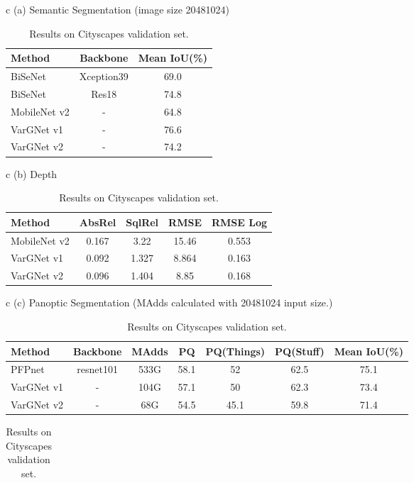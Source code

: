 \documentclass{article}
\begin{document}
\begin{table}
  \centering
  \caption{Results on Cityscapes validation set.}\label{tab:cs_res}
  \begin{tabular}{c}
    (a) Semantic Segmentation (image size 20481024)\\
    \begin{tabular}{lcc}
    \toprule
    Method & Backbone & Mean IoU(\%)  \\ \midrule
    BiSeNet\cite{yu2018bisenet} & Xception39 & 69.0 \\
    BiSeNet\cite{yu2018bisenet} & Res18 & 74.8 \\ \midrule
    MobileNet v2 & - & 64.8 \\ \midrule
    VarGNet v1 & - & 76.6 \\
    VarGNet v2 & - & 74.2 \\
\bottomrule
    \end{tabular} 
  \end{tabular}   
\begin{tabular}{c}
    (b) Depth \\
    \begin{tabular}{lcccc}
      \toprule
      Method & AbsRel & SqlRel & RMSE & RMSE Log \\ \midrule
      MobileNet v2 & 0.167 & 3.22 & 15.46 & 0.553 \\ \midrule
      VarGNet v1 & 0.092 & 1.327 & 8.864 & 0.163 \\
VarGNet v2 & 0.096 & 1.404 & 8.85 & 0.168 \\ 
      \bottomrule
    \end{tabular}   
  \end{tabular}   
  \begin{tabular}{c}
    (c) Panoptic Segmentation (MAdds calculated with 20481024 input size.) \\
    \begin{tabular}{lcccccc}
      \toprule
      Method & Backbone & MAdds & PQ & PQ(Things) & PQ(Stuff) & Mean IoU(\%)  \\ \midrule
      PFPnet\cite{Panoptic} & resnet101 & 533G & 58.1 & 52 & 62.5 & 75.1 \\
      VarGNet v1 & - & 104G & 57.1 & 50 & 62.3 & 73.4 \\
      VarGNet v2 & - & 68G & 54.5 & 45.1 & 59.8 & 71.4 \\
      \bottomrule
    \end{tabular}   
  \end{tabular}  
  \begin{tabular}{c}

\end{tabular}
\end{table}
\end{document}
